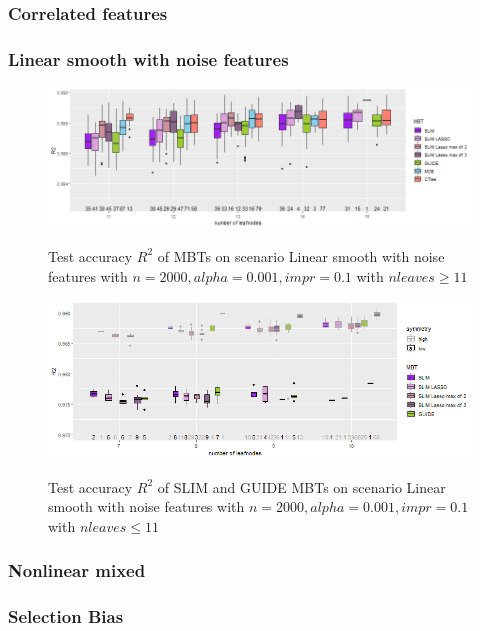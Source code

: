 \begin{table}
\begin{tabular}[t]{l|l|r|r|r|r|r|r|r|r|r}
\end{tabular}
\label{tab:app_linear_mixed_5000}

\end{table}



\subsubsection{Correlated features}

\subsubsection{Linear smooth with noise features}

\begin{figure} 
\caption{Test accuracy $R^2$ of MBTs on scenario Linear smooth with noise features with $n=2000, alpha = 0.001, impr = 0.1$ with $n leaves \geq 11$}
    \includegraphics[width=16cm]{Figures/simulations/batchtools/lasso/lasso_standalone_r2_test.png}
    \label{fig:app_lasso_standalone_r2_test}
\end{figure} 

\begin{figure}
\caption{Test accuracy $R^2$ of SLIM and GUIDE MBTs on scenario Linear smooth with noise features with $n=2000, alpha = 0.001, impr = 0.1$ with $n leaves \leq 11$}
    \includegraphics[width=16cm]{Figures/simulations/batchtools/lasso/lasso_standalone_r2_test_slim.png}
    \label{fig:app_lasso_standalone_r2_test_slim}
\end{figure} 

\subsubsection{Nonlinear mixed}


\subsubsection{Selection Bias}